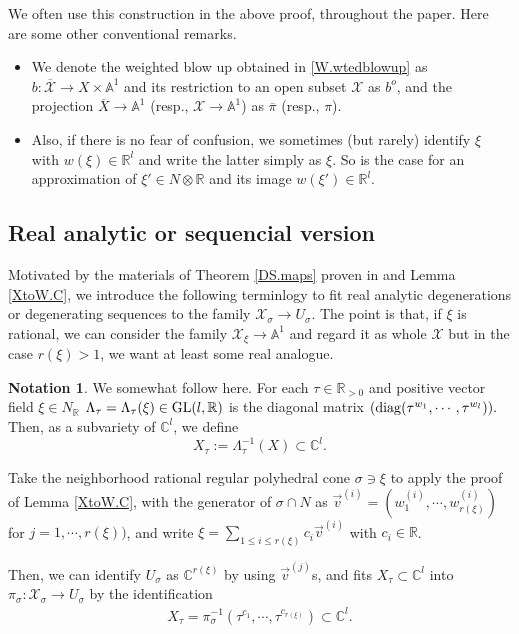 \documentclass[12pt,a4paper]{amsart}
\theoremstyle{remark}
\theoremstyle{definition}
\newtheorem{ntt}{Notation}
\def\R{\mathbb{R}}
\def\C{\mathbb{C}}
\def\A{\mathbb{A}}
\def\X{\mathcal{X}}
\begin{document}
We often use this construction in the above proof, 
throughout the paper. Here are some other conventional remarks. 
\begin{itemize}
    \item
We denote the weighted blow up obtained in 
\eqref{W.wtedblowup} 
as $b\colon \overline{\X}\to X\times \A^1$ 
and its restriction to an open subset $\X$ as $b^o$, 
and the projection $\overline{X}\to\A^1$ 
(resp., $\X\to \A^1$) 
as $\overline{\pi}$ (resp., $\pi$). 
\item 
Also, if there is no fear of confusion, we sometimes (but rarely) 
identify $\xi$ with $w(\xi)\in \R^l$ and write the latter simply as $\xi$. 
So is the case for an approximation of $\xi'\in N\otimes \R$ and its image $w(\xi')\in \R^l$. 
\end{itemize}

\subsection{Real analytic or sequencial version}
Motivated by the materials of 
Theorem \ref{DS.maps} proven in \cite{DSII} 
and Lemma \ref{XtoW.C}, 
we introduce the following terminlogy to fit real analytic 
degenerations or degenerating sequences to the family 
$\mathcal{X}_{\sigma}\to U_{\sigma}$. 
The point is that, if $\xi$ is rational, we can consider the 
family 
$\X_{\xi}\to \A^1$ and regard it as whole $\X$ but in the case $r(\xi)>1$, 
we want at least some real analogue. 

\begin{ntt}\label{ntt2}
We somewhat follow \cite[\S 2]{Od24a} here. 
For each $\tau\in \R_{>0}$ and 
positive vector field $\xi\in N_{\R}$  
$\Lambda_{\tau}=\Lambda_{\tau}(\xi)\in 
{\rm GL}(l,\R)$ is the diagonal matrix 
$({\rm diag}(\tau^{w_1},\cdots,\tau^{w_l})).$ 
Then, as a subvariety of $\C^l$, we define $$X_\tau:=\Lambda_{\tau}^{-1}(X)\subset \C^l.$$

\end{ntt}


Take the neighborhood rational 
regular polyhedral cone $\sigma\ni \xi$ 
to apply the proof of Lemma \ref{XtoW.C}, 
with the generator of $\sigma\cap N$ as 
$\vec{v}^{(i)}=(w_1^{(i)},\cdots,w_{r(\xi)}^{(i)})$  
for $j=1,\cdots,r(\xi))$, and write 
$\xi=\sum_{1\le i\le r(\xi)}c_i \vec{v}^{(i)}$ 
with $c_i\in \R$. 

Then, we can identify 
$U_\sigma$ as $\C^{r(\xi)}$ by using $\vec{v}^{(j)}$s, 
and  fits $X_\tau\subset \C^l$ 
 into $\pi_\sigma\colon 
\mathcal{X}_{\sigma}\to U_{\sigma}$ 
by the identification 
\begin{align}\label{Xtau}
X_\tau=\pi_\sigma^{-1}
(\tau^{c_1},\cdots,\tau^{c_{r(\xi)}})\subset \C^l.
\end{align}
\end{document}
